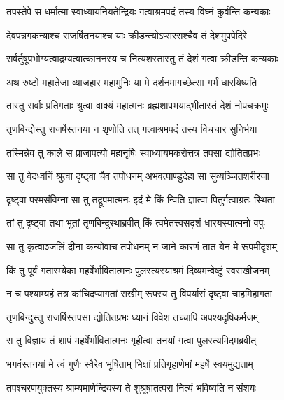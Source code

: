 \twolineshloka
{तपस्तेपे स धर्मात्मा स्वाध्यायनियतेन्द्रियः}
{गत्वाश्रमपदं तस्य विघ्नं कुर्वन्ति कन्यकाः} %

\twolineshloka
{देवपन्नगकन्याश्च राजर्षितनयाश्च याः}
{क्रीडन्त्योऽप्सरसश्चैव तं देशमुपपेदिरे} %

\twolineshloka
{सर्वर्तुषूपभोग्यत्वाद्रम्यत्वात्काननस्य च}
{नित्यशस्तास्तु तं देशं गत्वा क्रीडन्ति कन्यकाः} %

\twolineshloka
{अथ रुष्टो महातेजा व्याजहार महामुनिः}
{या मे दर्शनमागच्छेत्सा गर्भं धारयिष्यति} %

\twolineshloka
{तास्तु सर्वाः प्रतिगताः श्रुत्वा वाक्यं महात्मनः}
{ब्रह्मशापभयाद्भीतास्तं देशं नोपचक्रमुः} %

\twolineshloka
{तृणबिन्दोस्तु राजर्षेस्तनया न शृणोति तत्}
{गत्वाश्रमपदं तस्य विचचार सुनिर्भया} %

\twolineshloka
{तस्मिन्नेव तु काले स प्राजापत्यो महानृषिः}
{स्वाध्यायमकरोत्तत्र तपसा द्योतितप्रभः} %

\twolineshloka
{सा तु वेदध्वनिं श्रुत्वा दृष्ट्वा चैव तपोधनम्}
{अभवत्पाण्डुदेहा सा सुव्यञ्जितशरीरजा} %

\twolineshloka
{दृष्ट्वा परमसंविग्ना सा तु तद्रूपमात्मनः}
{इदं मे किं न्विति ज्ञात्वा पितुर्गत्वाग्रतः स्थिता} %

\twolineshloka
{तां तु दृष्ट्वा तथा भूतां तृणबिन्दुरथाब्रवीत्}
{किं त्वमेतत्त्वसदृशं धारयस्यात्मनो वपुः} %

\twolineshloka
{सा तु कृत्वाञ्जलिं दीना कन्योवाच तपोधनम्}
{न जाने कारणं तात येन मे रूपमीदृशम्} %

\twolineshloka
{किं तु पूर्वं गतास्म्येका महर्षेर्भावितात्मनः}
{पुलस्त्यस्याश्रमं दिव्यमन्वेष्टुं स्वसखीजनम्} %

\twolineshloka
{न च पश्याम्यहं तत्र कांचिदप्यागतां सखीम्}
{रूपस्य तु विपर्यासं दृष्ट्वा चाहमिहागता} %

\twolineshloka
{तृणबिन्दुस्तु राजर्षिस्तपसा द्योतितप्रभः}
{ध्यानं विवेश तच्चापि अपश्यदृषिकर्मजम्} %

\twolineshloka
{स तु विज्ञाय तं शापं महर्षेर्भावितात्मनः}
{गृहीत्वा तनयां गत्वा पुलस्त्यमिदमब्रवीत्} %

\twolineshloka
{भगवंस्तनयां मे त्वं गुणैः स्वैरेव भूषिताम्}
{भिक्षां प्रतिगृहाणेमां महर्षे स्वयमुद्यताम्} %

\twolineshloka
{तपश्चरणयुक्तस्य श्राम्यमाणेन्द्रियस्य ते}
{शुश्रूषातत्परा नित्यं भविष्यति न संशयः} %

